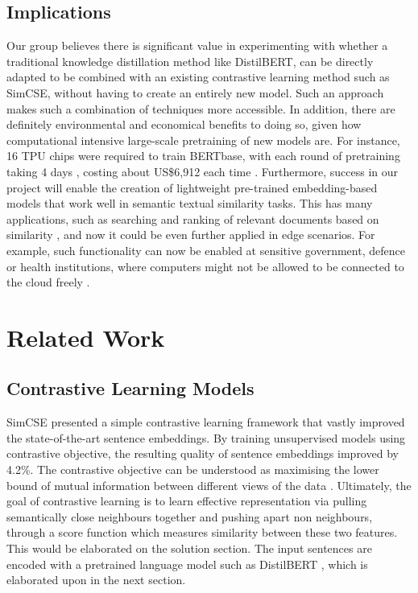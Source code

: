 \documentclass[10pt,twocolumn,letterpaper]{article}
\begin{document}
\subsection{Implications}

Our group believes there is significant value in experimenting with whether a traditional knowledge distillation method like DistilBERT, can be directly adapted to be combined with an existing contrastive learning method such as SimCSE, without having to create an entirely new model. Such an approach makes such a combination of techniques more accessible. In addition, there are definitely environmental and economical benefits to doing so, given how computational intensive large-scale pretraining of new models are. For instance, 16 TPU chips were required to train BERTbase, with each round of pretraining taking 4 days \cite{1810.04805}, costing about US\$6,912 each time \cite{cost.sota.ai}. Furthermore, success in our project will enable the creation of lightweight pre-trained embedding-based models that work well in semantic textual similarity tasks. This has many applications, such as searching and ranking of relevant documents based on similarity \cite{robust.sts}, and now it could be even further applied in edge scenarios. For example, such functionality can now be enabled at sensitive government, defence or health institutions, where computers might not be allowed to be connected to the cloud freely \cite{1910.01108}.

\section{Related Work}

\subsection{Contrastive Learning Models}

SimCSE \cite{2104.08821} presented a simple contrastive learning framework that vastly improved the state-of-the-art sentence embeddings. By training unsupervised models using contrastive objective, the resulting quality of sentence embeddings improved by 4.2\%. The contrastive objective can be understood as maximising the lower bound of mutual information between different views of the data \cite{1808.06670}. Ultimately, the goal of contrastive learning is to learn effective representation via pulling semantically close neighbours together and pushing apart  non neighbours,  through a score function which measures similarity between these two features. This would be elaborated on the solution section. The input sentences are encoded with a pretrained language model such as DistilBERT , which is elaborated upon in the next section.
\end{document}
